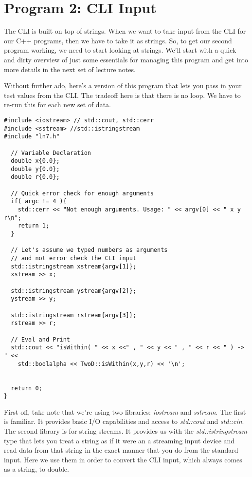 \documentclass[]{tufte-handout}
\begin{document}
\section{Program 2: CLI Input}

The CLI is built on top of strings. When we want to take input from the CLI for our C++ programs, then we have to take it as strings.  So, to get our second program working, we need to start looking at strings. We'll start with a quick and dirty overview of just some essentials for managing this program and get into more details in the next set of lecture notes.

Without further ado, here's a version of this program that lets you pass in your test values from the CLI. The tradeoff here is that there is no loop. We have to re-run this for each new set of data.
\begin{verbatim}
#include <iostream> // std::cout, std::cerr
#include <sstream> //std::istringstream
#include "ln7.h"

  // Variable Declaration
  double x{0.0};
  double y{0.0};
  double r{0.0};

  // Quick error check for enough arguments
  if( argc != 4 ){
    std::cerr << "Not enough arguments. Usage: " << argv[0] << " x y r\n";
    return 1;
  }

  // Let's assume we typed numbers as arguments
  // and not error check the CLI input
  std::istringstream xstream{argv[1]};
  xstream >> x;

  std::istringstream ystream{argv[2]};
  ystream >> y;

  std::istringstream rstream{argv[3]};
  rstream >> r;

  // Eval and Print
  std::cout << "isWithin( " << x <<" , " << y << " , " << r << " ) -> " <<
    std::boolalpha << TwoD::isWithin(x,y,r) << '\n';


  return 0;
}
\end{verbatim}

First off, take note that we're using two libraries: \textit{iostream} and \textit{sstream}. The first is familiar. It provides basic I/O capabilities and access to \textit{std::cout} and \textit{std::cin}. The second library is for string streams. It provides us with the \textit{std::istringstream} type that lets you treat a string as if it were an a streaming input device and read data from that string in the exact manner that you do from the standard input. Here we use them in order to convert the CLI input, which always comes as a string, to double.
\end{document}
